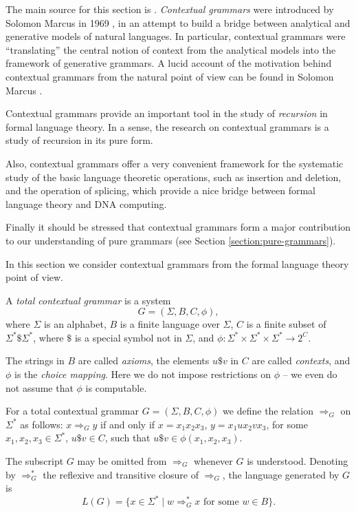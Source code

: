 The main source for this section is \citep{EhPaRo1997contextual}. \emph{Contextual grammars} were introduced by Solomon Marcus in 1969 \citep{M69}, in an attempt to build a bridge between analytical and generative models of natural languages. In particular, contextual grammars were ``translating'' the central notion of context from the analytical models into the framework of generative grammars. A lucid account of the motivation behind contextual grammars from the natural point of view can be found in Solomon Marcus \citep{Ma1997contextual}.

Contextual grammars provide an important tool in the study of \emph{recursion} in formal language theory. In a sense, the research on contextual grammars is a study of recursion in its pure form.

Also, contextual grammars offer a very convenient framework for the systematic study of the basic language theoretic operations, such as insertion and deletion, and the operation of splicing, which provide a nice bridge between formal language theory and DNA computing.

Finally it should be stressed that contextual grammars form a major contribution to our understanding of pure grammars (see Section \ref{section:pure-grammars}).

In this section we consider contextual grammars from the formal language theory point of view.

A \emph{total contextual grammar} is a system
$$G = (\Sigma, B, C, \phi),$$
where $\Sigma$ is an alphabet, $B$ is a finite language over $\Sigma$, $C$ is a finite subset of $\Sigma^* \$ \Sigma^*$, where $\$$ is a special symbol not in $\Sigma$, and $\phi: \Sigma^* \times \Sigma^* \times \Sigma^* \to 2^C$.

The strings in $B$ are called \emph{axioms}, the elements $u \$ v$ in $C$ are called \emph{contexts}, and $\phi$ is the \emph{choice mapping}. Here we do not impose restrictions on $\phi$ -- we even do not assume that $\phi$ is computable.

For a total contextual grammar $G = (\Sigma, B, C, \phi)$ we define the relation $\Rightarrow_G$ on $\Sigma^*$ as follows: $x \Rightarrow_G y$ if and only if $x = x_1 x_2 x_3$, $y = x_1 u x_2 v x_3$, for some $x_1, x_2, x_3 \in \Sigma^*$, $u \$ v \in C$, such that $u \$ v \in \phi(x_1, x_2, x_3)$.

The subscript $G$ may be omitted from $\Rightarrow_G$ whenever $G$ is understood. Denoting by $\Rightarrow^*_G$ the reflexive and transitive closure of $\Rightarrow_G$, the language generated by $G$ is
$$L(G) = \{x \in \Sigma^* \mid w \Rightarrow^*_G x \text{ for some } w \in B\}.$$


